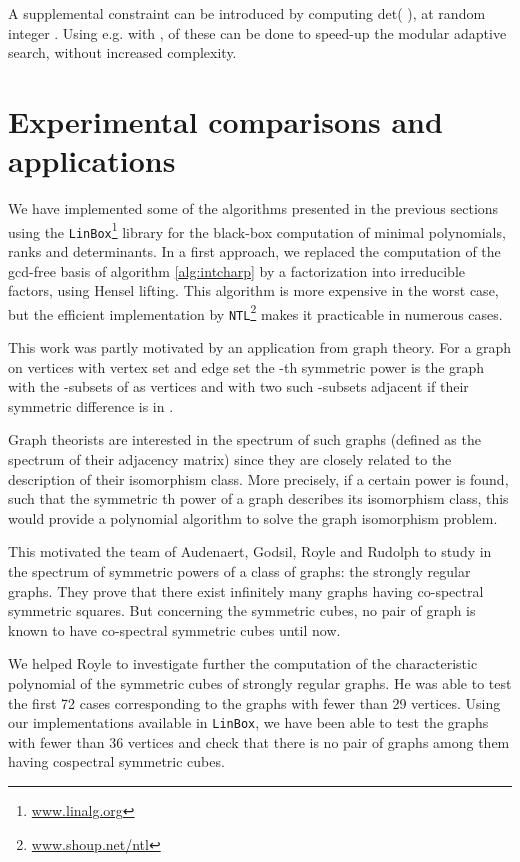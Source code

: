 \documentclass{article}
\begin{document}
A supplemental constraint can be introduced by 
computing det( ),
at random integer . 
Using e.g. \cite[Theorem 4.2]{jgd:2006:det} with \cite{Eberly:2006:sparse},
 of these 
can be done to speed-up the modular adaptive search,
without increased complexity.

\section{Experimental comparisons and applications}\label{sec:exp}

We have implemented some of the algorithms presented in the previous sections using the
\texttt{LinBox}\footnote{\url{www.linalg.org}} library for the black-box
computation of minimal polynomials, ranks and determinants.
In a first approach, we replaced the computation of the gcd-free basis of
algorithm \ref{alg:intcharp} by a factorization into irreducible factors, using
Hensel lifting. This algorithm is more expensive in the worst case, but the
efficient implementation by \texttt{NTL}\footnote{\url{www.shoup.net/ntl}} 
makes it practicable in numerous cases.

This work was partly motivated by an application from graph theory.
For a graph  on  vertices with vertex set  and edge set
 the -th symmetric power  is the graph with the
 -subsets of  as vertices and with two such
-subsets adjacent if their symmetric difference is in .

Graph theorists are interested in the spectrum of such graphs (defined as the
spectrum of their adjacency matrix) since they are closely related to the
description of their isomorphism class. 
More precisely, if a certain power  is found, such that the symmetric th 
power of a graph describes its isomorphism class, this would provide a polynomial
algorithm to solve the graph isomorphism problem. 

This motivated the team of Audenaert, Godsil, Royle and Rudolph to study in
\cite{Royle:2007:symm} the spectrum of  symmetric powers of a class of graphs:
the strongly regular graphs. They prove that there exist infinitely many graphs
having co-spectral symmetric squares. But concerning the symmetric cubes, no
pair of graph is known to have co-spectral symmetric cubes until now.

We helped Royle to investigate further the computation of the characteristic
polynomial of the symmetric cubes of strongly regular graphs. 
He was able to test the first 72 cases corresponding to the graphs with fewer
than 29 vertices. Using our implementations available in \texttt{LinBox}, we
have been able to test the   graphs with fewer than 36 vertices and
check that there is no pair of graphs among them having cospectral symmetric
cubes.
\end{document}
